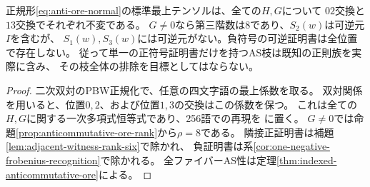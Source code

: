 \begin{proposition}[単一正証明書の残余は空ではない]\label{prop:ore-opposite-positive-witness}
正規形\eqref{eq:anti-ore-normal}の標準最上テンソルは、全ての$H,G$について
$02$交換と$13$交換でそれぞれ不変である。
$G\ne0$なら第三階数は8であり、$S_2(w)$は可逆元$I$を含むが、
$S_1(w),S_3(w)$には可逆元がない。負符号の可逆証明書は全位置で存在しない。
従って単一の正符号証明書だけを持つAS枝は既知の正則族を実際に含み、
その枝全体の排除を目標としてはならない。
\end{proposition}
\begin{proof}
二次双対のPBW正規化で、任意の四文字語の最上係数を取る。
双対関係を用いると、位置$0,2$、および位置$1,3$の交換はこの係数を保つ。
これは全ての$H,G$に関する一次多項式恒等式であり、256語での再現を
に置く。
$G\ne0$では命題\ref{prop:anticommutative-ore-rank}から$\rho=8$である。
隣接正証明書は補題\ref{lem:adjacent-witness-rank-six}で除かれ、
負証明書は系\ref{cor:one-negative-frobenius-recognition}で除かれる。
全ファイバーAS性は定理\ref{thm:indexed-anticommutative-ore}による。
\end{proof}
